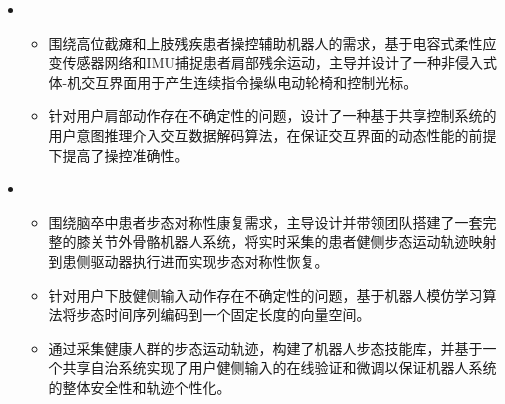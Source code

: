   \begin{itemize}[leftmargin=*]
    \item {}
    {\small
      \begin{itemize}
        \item 围绕高位截瘫和上肢残疾患者操控辅助机器人的需求，基于电容式柔性应变传感器网络和IMU捕捉患者肩部残余运动，主导并设计了一种非侵入式体-机交互界面用于产生连续指令操纵电动轮椅和控制光标。
        \item 针对用户肩部动作存在不确定性的问题，设计了一种基于共享控制系统的用户意图推理介入交互数据解码算法，在保证交互界面的动态性能的前提下提高了操控准确性。
      \end{itemize}
    }

    \item {}
    {\small
    \begin{itemize}
      \item 围绕脑卒中患者步态对称性康复需求，主导设计并带领团队搭建了一套完整的膝关节外骨骼机器人系统，将实时采集的患者健侧步态运动轨迹映射到患侧驱动器执行进而实现步态对称性恢复。
      \item 针对用户下肢健侧输入动作存在不确定性的问题，基于机器人模仿学习算法将步态时间序列编码到一个固定长度的向量空间。
      \item 通过采集健康人群的步态运动轨迹，构建了机器人步态技能库，并基于一个共享自治系统实现了用户健侧输入的在线验证和微调以保证机器人系统的整体安全性和轨迹个性化。
    \end{itemize}
    }


\end{itemize}
